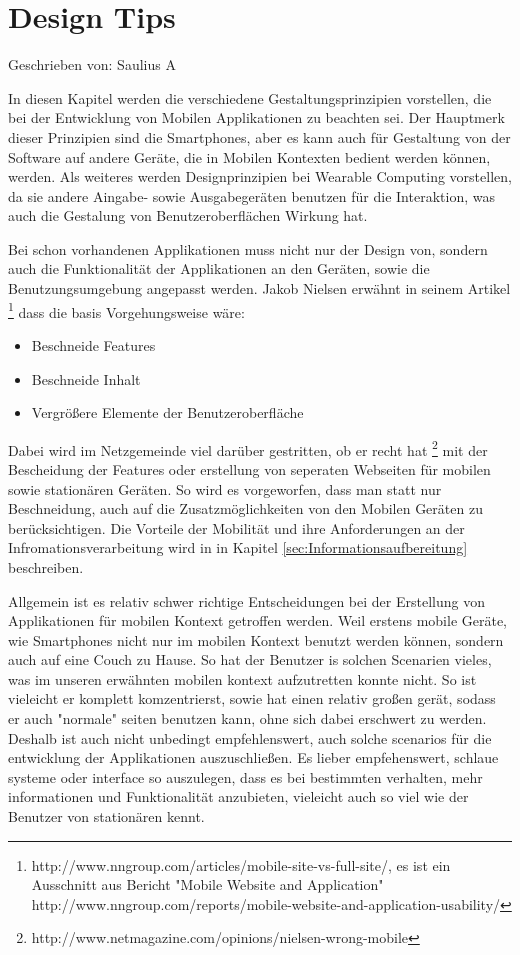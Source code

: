 
\section{Design Tips}

Geschrieben von: Saulius A

In diesen Kapitel werden die verschiedene Gestaltungsprinzipien vorstellen, die bei der Entwicklung von Mobilen Applikationen zu beachten sei. Der Hauptmerk dieser Prinzipien sind die Smartphones, aber es kann auch für Gestaltung von der Software auf andere Geräte, die in Mobilen Kontexten bedient werden können, werden. Als weiteres werden Designprinzipien bei Wearable Computing vorstellen, da sie andere Aingabe- sowie Ausgabegeräten benutzen für die Interaktion, was auch die Gestalung von Benutzeroberflächen Wirkung hat.

Bei schon vorhandenen Applikationen muss nicht nur der Design von, sondern auch die Funktionalität der Applikationen an den Geräten, sowie die Benutzungsumgebung angepasst werden. Jakob Nielsen erwähnt in seinem Artikel \footnote{http://www.nngroup.com/articles/mobile-site-vs-full-site/, es ist ein Ausschnitt aus Bericht "Mobile Website and Application" http://www.nngroup.com/reports/mobile-website-and-application-usability/} dass die basis Vorgehungsweise wäre:

\begin{itemize}
	\item Beschneide Features
	\item Beschneide Inhalt
	\item Vergrößere Elemente der Benutzeroberfläche
\end{itemize}

Dabei wird im Netzgemeinde viel darüber gestritten, ob er recht hat \footnote{http://www.netmagazine.com/opinions/nielsen-wrong-mobile} mit der Bescheidung der Features oder erstellung von seperaten Webseiten für mobilen sowie stationären Geräten. So wird es vorgeworfen, dass man statt nur Beschneidung, auch auf die Zusatzmöglichkeiten von den Mobilen Geräten zu berücksichtigen. Die Vorteile der Mobilität und ihre Anforderungen an der Infromationsverarbeitung wird in in Kapitel \ref{sec:Informationsaufbereitung} beschreiben.

Allgemein ist es relativ schwer richtige Entscheidungen bei der Erstellung von Applikationen für mobilen Kontext getroffen werden. Weil erstens mobile Geräte, wie Smartphones nicht nur im mobilen Kontext benutzt werden können, sondern auch auf eine Couch zu Hause. So hat der Benutzer is solchen Scenarien vieles, was im unseren erwähnten mobilen kontext aufzutretten konnte nicht. So ist vieleicht er komplett komzentrierst, sowie hat einen relativ großen gerät, sodass er auch "normale" seiten benutzen kann, ohne sich dabei erschwert zu werden. Deshalb ist auch nicht unbedingt empfehlenswert, auch solche scenarios für die entwicklung der Applikationen auszuschließen. Es lieber empfehenswert, schlaue systeme oder interface so auszulegen, dass es bei bestimmten verhalten, mehr informationen und Funktionalität anzubieten, vieleicht auch so viel wie der Benutzer von stationären kennt.

